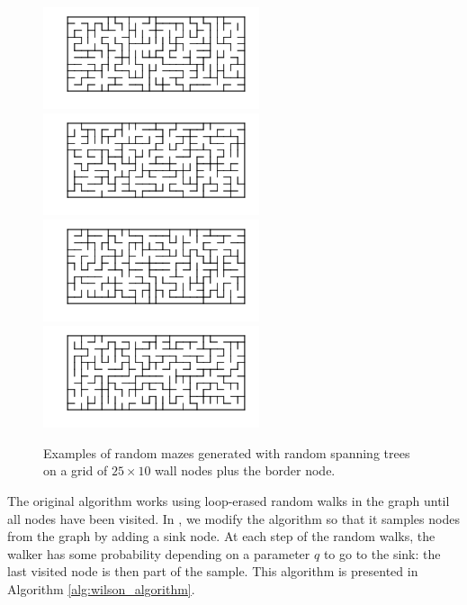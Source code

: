 \documentclass{article}
\begin{document}
\begin{figure}[ht]
\centering
\includegraphics[height=3cm]{maze1.png}
\includegraphics[height=3cm]{maze2.png}
\includegraphics[height=3cm]{maze3.png}
\includegraphics[height=3cm]{maze4.png}
\caption{Examples of random mazes generated with random spanning trees on a grid of $25\times10$ wall nodes plus the border node.}\label{fig:randommazes}
\end{figure}


The original algorithm works using loop-erased random walks in the graph until all nodes have been visited. In \cite{tremblay2017}, we modify the algorithm so that it samples nodes from the graph by adding a sink node. At each step of the random walks, the walker has some probability depending on a parameter $q$ to go to the sink: the last visited node is then part of the sample. This algorithm is presented in Algorithm \ref{alg:wilson_algorithm}.
\end{document}
